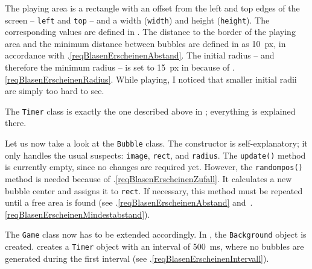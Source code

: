 The playing area is a rectangle with an offset from the left and top edges of the screen -- \texttt{left} and \texttt{top} -- and a width (\texttt{width}) and height (\texttt{height}). The corresponding values are defined in . The distance to the border of the playing area and the minimum distance between bubbles are defined in  as \SI{10}{px}, in accordance with .\ref{reqBlasenErscheinenAbstand}. The initial radius -- and therefore the minimum radius -- is set to \SI{15}{px} in  because of .\ref{reqBlasenErscheinenRadius}. While playing, I noticed that smaller initial radii are simply too hard to see.


The \texttt{Timer} class is exactly the one described above in ; everything is explained there.


Let us now take a look at the \texttt{Bubble} class. The constructor is self-explanatory; it only handles the usual suspects: \texttt{image}, \texttt{rect}, and \texttt{radius}. The \texttt{update()} method is currently empty, since no changes are required yet. However, the \texttt{randompos()} method is needed because of .\ref{reqBlasenErscheinenZufall}. It calculates a new bubble center and assigns it to \texttt{rect}. If necessary, this method must be repeated until a free area is found (see .\ref{reqBlasenErscheinenAbstand} and~.\ref{reqBlasenErscheinenMindestabstand}).


The \texttt{Game} class now has to be extended accordingly. In , the \texttt{Background} object is created.  creates a \texttt{Timer} object with an interval of \SI{500}{ms}, where no bubbles are generated during the first interval (see .\ref{reqBlasenErscheinenIntervall}).

